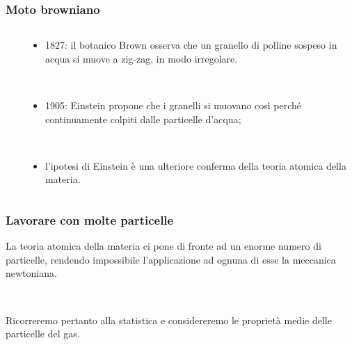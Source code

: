 \documentclass[]{beamer}
\theoremstyle{plain}
\begin{document}
\begin{frame}
\frametitle{Moto browniano}
\begin{columns}
\begin{column}{0.2\textwidth}
~
~
\end{column}
\begin{column}{0.6\textwidth}
\begin{itemize}
\item<1-> 1827: il botanico Brown osserva che un granello di polline sospeso in acqua si muove a zig-zag, in modo irregolare.

~

\item<2-> 1905: Einstein propone che i granelli si muovano così perché continuamente colpiti dalle particelle d'acqua;

~

\item<3-> l'ipotesi di Einstein è una ulteriore conferma della teoria atomica della materia.
\begin{center}
\href{video/Brown.mp4}{}
\end{center}
\end{itemize}
\end{column}
\end{columns}
\end{frame}





\begin{frame}
\frametitle{Lavorare con molte particelle}
La teoria atomica della materia ci pone di fronte ad un \alert<1>{enorme numero di particelle}, rendendo impossibile l'applicazione ad ognuna di esse la meccanica newtoniana.\pause

~

Ricorreremo pertanto alla statistica e considereremo le \alert{proprietà medie} delle particelle del gas.
\end{frame}
\end{document}
